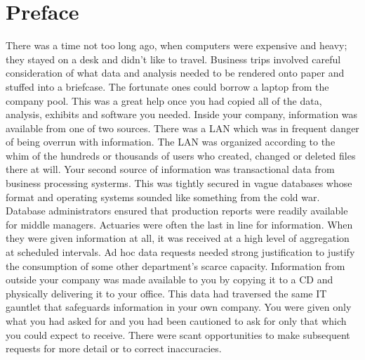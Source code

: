 \chapter{Preface}
There was a time not too long ago, when computers were expensive and heavy; they stayed on a desk and didn't like to travel. Business trips involved careful consideration of what data and analysis needed to be rendered onto paper and stuffed into a briefcase. The fortunate ones could borrow a laptop from the company pool. This was a great help once you had copied all of the data, analysis, exhibits and software you needed. Inside your company, information was available from one of two sources. There was a LAN which was in frequent danger of being overrun with information. The LAN was organized according to the whim of the hundreds or thousands of users who created, changed or deleted files there at will. Your second source of information was transactional data from business processing systerms. This was tightly secured in vague databases whose format and operating systems sounded like something from the cold war. Database administrators ensured that production reports were readily available for middle managers. Actuaries were often the last in line for information. When they were given information at all, it was received at a high level of aggregation at scheduled intervals. Ad hoc data requests needed strong justification to justify the consumption of some other department's scarce capacity. Information from outside your company was made available to you by copying it to a CD and physically delivering it to your office. This data had traversed the same IT gauntlet that safeguards information in your own company. You were given only what you had asked for and you had been cautioned to ask for only that which you could expect to receive. There were scant opportunities to make subsequent requests for more detail or to correct inaccuracies.

